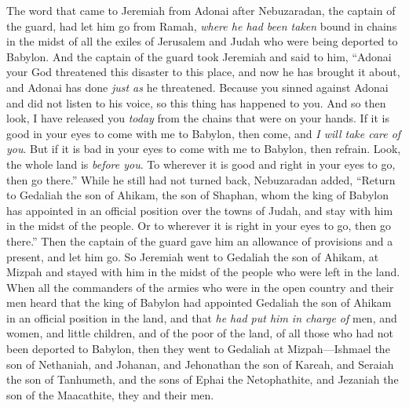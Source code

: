 \begin{biblechapter} %
 The word that came to Jeremiah from Adonai after Nebuzaradan, the captain of the guard, had let him go from Ramah, \textit{where he had been taken} bound in chains in the midst of all the exiles of Jerusalem and Judah who were being deported to Babylon.
\verse And the captain of the guard took Jeremiah and said to him, “Adonai your God threatened this disaster to this place,
\verse and now he has brought it about, and Adonai has done \textit{just as} he threatened. Because you sinned against Adonai and did not listen to his voice, so this thing has happened to you.
\verse And so then look, I have released you \textit{today} from the chains that were on your hands. If it is good in your eyes to come with me to Babylon, then come, and \textit{I will take care of you}. But if it is bad in your eyes to come with me to Babylon, then refrain. Look, the whole land is \textit{before you}. To wherever it is good and right in your eyes to go, then go there.”
\verse While he still had not turned back, Nebuzaradan added, “Return to Gedaliah the son of Ahikam, the son of Shaphan, whom the king of Babylon has appointed in an official position over the towns of Judah, and stay with him in the midst of the people. Or to wherever it is right in your eyes to go, then go there.” Then the captain of the guard gave him an allowance of provisions and a present, and let him go.
\verse So Jeremiah went to Gedaliah the son of Ahikam, at Mizpah and stayed with him in the midst of the people who were left in the land.
 When all the commanders of the armies who were in the open country and their men heard that the king of Babylon had appointed Gedaliah the son of Ahikam in an official position in the land, and that \textit{he had put him in charge of} men, and women, and little children, and of the poor of the land, of all those who had not been deported to Babylon,
\verse then they went to Gedaliah at Mizpah—Ishmael the son of Nethaniah, and Johanan, and Jehonathan the son of Kareah, and Seraiah the son of Tanhumeth, and the sons of Ephai the Netophathite, and Jezaniah the son of the Maacathite, they and their men.

\end{biblechapter}
